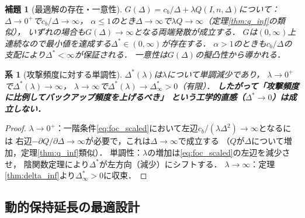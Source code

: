 \documentclass[12pt,a4paper]{article}
\theoremstyle{plain}
\newtheorem{lemma}[theorem]{補題}
\newtheorem{corollary}[theorem]{系}
\theoremstyle{definition}
\theoremstyle{remark}
\newcommand{\Dopt}{\Delta^{*}}
\newcommand{\Dinf}{\Delta^{*}_{\infty}}
\begin{document}
\begin{lemma}[最適解の存在・一意性]\label{lem:exist}
$G(\Delta)=c_b/\Delta+\lambda Q(I,n,\Delta)$について：
$\Delta\to0^+$で$c_b/\Delta\to\infty$，
$\alpha\le1$のとき$\Delta\to\infty$で$\lambda Q\to\infty$（定理\ref{thm:q_inf}の類似），
いずれの場合も$G(\Delta)\to\infty$となる両端発散が成立する．
$G$は$(0,\infty)$上連続なので最小値を達成する$\Dopt\in(0,\infty)$が存在する．
$\alpha>1$のときも$c_b/\Delta$の支配により$\Dopt<\infty$が保証される．
一意性は$G(\Delta)$の擬凸性から導かれる．
\end{lemma}

\begin{corollary}[攻撃頻度に対する単調性]\label{cor:monotone}
$\Dopt(\lambda)$は$\lambda$について単調減少であり，
$\lambda\to0^+$で$\Dopt(\lambda)\to\infty$，
$\lambda\to\infty$で$\Dopt(\lambda)\to\Dinf>0$（有限）．
\textbf{したがって「攻撃頻度に比例してバックアップ頻度を上げるべき」
という工学的直感（$\Dopt\to0$）は成立しない．}
\end{corollary}

\begin{proof}
$\lambda\to0^+$：一階条件\eqref{eq:foc_scaled}において左辺$c_b/(\lambda\Delta^2)\to\infty$となるには
右辺$-\partial Q/\partial\Delta\to\infty$が必要で，これは$\Delta\to\infty$で成立する
（$Q$が$\Delta$について増加，定理\ref{thm:q_inf}類似）．
単調性：$\lambda$の増加は\eqref{eq:foc_scaled}の左辺を減少させ，
陰関数定理により$\Dopt$が左方向（減少）にシフトする．
$\lambda\to\infty$：定理\ref{thm:delta_inf}より$\Dinf>0$に収束．
\end{proof}

\subsection{動的保持延長の最適設計}
\end{document}
